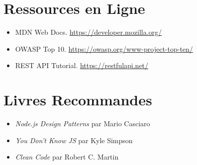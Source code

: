 \documentclass[a4paper,12pt]{book}
\begin{document}
\section*{Ressources en Ligne}

\begin{itemize}
    \item MDN Web Docs. \url{https://developer.mozilla.org/}
    \item OWASP Top 10. \url{https://owasp.org/www-project-top-ten/}
    \item REST API Tutorial. \url{https://restfulapi.net/}
\end{itemize}

\section*{Livres Recommandes}

\begin{itemize}
    \item \textit{Node.js Design Patterns} par Mario Casciaro
    \item \textit{You Don't Know JS} par Kyle Simpson
    \item \textit{Clean Code} par Robert C. Martin
\end{itemize}

\end{document}
